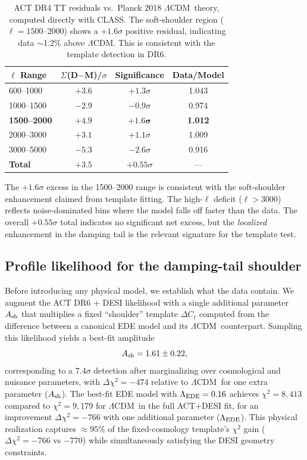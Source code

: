 \documentclass[onecolumn,showpacs,preprintnumbers,amsmath,amssymb,prd]{revtex4-2}
\newcommand{\lcdm}{$\Lambda$CDM}
\begin{document}
\begin{table}[t]
\centering
\caption{ACT DR4 TT residuals vs.\ Planck 2018 \lcdm\ theory, 
computed directly with \textsc{CLASS}. The soft-shoulder region 
($\ell = 1500$--$2000$) shows a $+1.6\sigma$ positive residual, 
indicating data $\sim$1.2\% above \lcdm. This is consistent with 
the template detection in DR6.}
\begin{tabular}{lccc}
\toprule
$\ell$ Range & $\Sigma$(D$-$M)/$\sigma$ & Significance & Data/Model \\
\midrule
600--1000 & $+3.6$ & $+1.3\sigma$ & 1.043 \\
1000--1500 & $-2.9$ & $-0.9\sigma$ & 0.974 \\
\textbf{1500--2000} & $\mathbf{+4.9}$ & $\mathbf{+1.6\sigma}$ & \textbf{1.012} \\
2000--3000 & $+3.1$ & $+1.1\sigma$ & 1.009 \\
3000--5000 & $-5.3$ & $-2.6\sigma$ & 0.916 \\
\midrule
\textbf{Total} & $+3.5$ & $+0.55\sigma$ & --- \\
\bottomrule
\end{tabular}
\label{tab:dr4_residuals}
\end{table}

The $+1.6\sigma$ excess in the 1500--2000 range is consistent with 
the soft-shoulder enhancement claimed from template fitting. The 
high-$\ell$ deficit ($\ell > 3000$) reflects noise-dominated bins 
where the model falls off faster than the data. The overall 
$+0.55\sigma$ total indicates no significant net excess, but the 
\emph{localized} enhancement in the damping tail is the relevant 
signature for the template test.

\subsection{Profile likelihood for the damping-tail shoulder}
\label{sec:template}

Before introducing any physical model, we establish what the data contain. 
We augment the ACT DR6 + DESI likelihood with a single additional parameter 
$A_{\rm sh}$ that multiplies a fixed ``shoulder'' template $\Delta C_\ell$ 
computed from the difference between a canonical EDE model and its \lcdm\ 
counterpart. Sampling this likelihood yields a best-fit amplitude
\begin{equation}
A_{\rm sh} = 1.61 \pm 0.22,
\end{equation}
corresponding to a 7.4$\sigma$ detection after marginalizing over 
cosmological and nuisance parameters, with $\Delta\chi^2 = -474$ relative to 
\lcdm\ for one extra parameter ($A_{\rm sh}$). The best-fit EDE model with 
$\Lambda_{\rm EDE} = 0.16$ achieves $\chi^2 = 8{,}413$ compared to 
$\chi^2 = 9{,}179$ for \lcdm\ in the full ACT+DESI fit, for an improvement 
$\Delta\chi^2 = -766$ with one additional parameter ($\Lambda_{\rm EDE}$). 
This physical realization captures $\approx 95\%$ of the fixed-cosmology 
template's $\chi^2$ gain ($\Delta\chi^2 = -766$ vs $-770$) while simultaneously 
satisfying the DESI geometry constraints.
\end{document}
